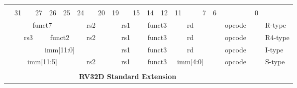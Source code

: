 \newpage

\begin{table}[p]
\begin{small}
\begin{center}
    \begin{tabular} {p{0.002in}p{0.002in}p{0.002in}p{0.002in}p{0.002in}p{0.002in}p{0.002in}p{0.002in}p{0.002in}p{0.002in}p{0.002in}p{0.002in}p{0.002in}p{0.002in}p{0.002in}p{0.002in}p{0.002in}p{0.002in}p{0.002in}p{0.002in}p{0.002in}p{0.002in}p{0.002in}p{0.002in}p{0.002in}p{0.002in}p{0.002in}p{0.002in}p{0.002in}p{0.002in}p{0.002in}p{0.002in}p{0.002in}l}
    & & & & & & & & & & & & & & & & & & & & & & & & & & & & & & & & \\

            &

    \multicolumn{3}{l}{31} &
    \multicolumn{2}{r}{27} &
    \multicolumn{1}{c}{26} &
    \multicolumn{1}{r}{25} &
    \multicolumn{3}{l}{24} &
    \multicolumn{2}{r}{20} &
    \multicolumn{3}{l}{19} &
    \multicolumn{2}{r}{15} &
    \multicolumn{2}{l}{14} &
    \multicolumn{1}{r}{12} &
    \multicolumn{4}{l}{11} &
    \multicolumn{1}{r}{7} &
    \multicolumn{6}{l}{6} &
    \multicolumn{1}{r}{0} \\
    \cline{2-33}
&


\multicolumn{7}{|c|}{funct7} &
\multicolumn{5}{c|}{rs2} &
\multicolumn{5}{c|}{rs1} &
\multicolumn{3}{c|}{funct3} &
\multicolumn{5}{c|}{rd} &
\multicolumn{7}{|c|}{opcode} & R-type \\
\cline{2-33}
&

\multicolumn{5}{|c|}{rs3} &
\multicolumn{2}{c|}{funct2} &
\multicolumn{5}{c|}{rs2} &
\multicolumn{5}{c|}{rs1} &
\multicolumn{3}{c|}{funct3} &
\multicolumn{5}{c|}{rd} &
\multicolumn{7}{|c|}{opcode} & R4-type \\
\cline{2-33}
&

\multicolumn{12}{|c|}{imm[11:0]} &
\multicolumn{5}{c|}{rs1} &
\multicolumn{3}{c|}{funct3} &
\multicolumn{5}{c|}{rd} &
\multicolumn{7}{|c|}{opcode} & I-type \\
\cline{2-33}
&

\multicolumn{7}{|c|}{imm[11:5]} &
\multicolumn{5}{c|}{rs2} &
\multicolumn{5}{c|}{rs1} &
\multicolumn{3}{c|}{funct3} &
\multicolumn{5}{c|}{imm[4:0]} &
\multicolumn{7}{|c|}{opcode} & S-type \\
\cline{2-33}
&




\multicolumn{32}{c}{} & \\
\multicolumn{32}{c}{\bf RV32D Standard Extension } & \\
\cline{2-33}


\end{tabular}
\end{center}
\end{small}
\end{table}
